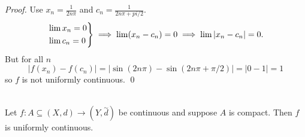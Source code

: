 \begin{proof}
    Use $x_n = \frac{1}{2n\pi}$ and $c_n = \frac{1}{2n\pi + pi/2}.$
    $$\begin{rcases*}
        \lim x_n = 0 \\
        \lim c_n = 0
    \end{rcases*}
    \implies \lim (x_n - c_n) = 0 \implies \lim |x_n - c_n| = 0.$$
    But for all $n$
    $$|f(x_n) - f(c_n)| = |\sin (2n\pi) - \sin (2n\pi + \pi / 2)| = |0-1| = 1$$
    so $f$ is not uniformly continuous. \qed
\end{proof}

\begin{theorem} \leavevmode \\
    \label{thm4.19}
    Let $f: A \subseteq (X,d) \to (Y, \overset{\sim}{d})$ be continuous and suppose $A$ is compact. Then $f$ is uniformly continuous.
\end{theorem}

